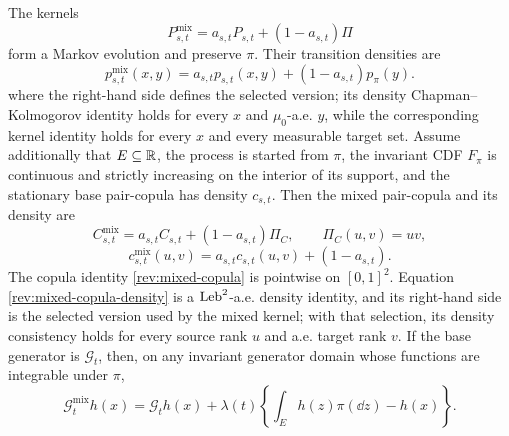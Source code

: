 \begin{theorem}
\label{rev:thm-mixed-kernel}
The kernels
\begin{equation}
P^{\mathrm{mix}}_{s,t}
=a_{s,t}P_{s,t}+(1-a_{s,t})\Pi
\label{rev:mixed-kernel}
\end{equation}
form a Markov evolution and preserve $\pi$.  Their transition densities are
\begin{equation}
p^{\mathrm{mix}}_{s,t}(x,y)
=a_{s,t}p_{s,t}(x,y)+(1-a_{s,t})p_\pi(y).
\label{rev:mixed-transition-density}
\end{equation}
where the right-hand side defines the selected version; its density
Chapman--Kolmogorov identity holds for every $x$ and $\mu_0$-a.e. $y$, while
the corresponding kernel identity holds for every $x$ and every measurable
target set.
Assume additionally that $E\subseteq\mathbb R$, the process is started from $\pi$,
the invariant CDF $F_\pi$ is continuous and strictly increasing on the
interior of its support, and the stationary base pair-copula has density
$c_{s,t}$.  Then the mixed pair-copula and its density are
\begin{equation}
C^{\mathrm{mix}}_{s,t}
=a_{s,t}C_{s,t}+(1-a_{s,t})\Pi_C,
\qquad \Pi_C(u,v)=uv,
\label{rev:mixed-copula}
\end{equation}
\begin{equation}
c^{\mathrm{mix}}_{s,t}(u,v)
=a_{s,t}c_{s,t}(u,v)+(1-a_{s,t}).
\label{rev:mixed-copula-density}
\end{equation}
The copula identity \eqref{rev:mixed-copula} is pointwise on $[0,1]^2$.
Equation \eqref{rev:mixed-copula-density} is a $\operatorname{Leb}^2$-a.e. density identity,
and its right-hand side is the selected version used by the mixed kernel; with
that selection, its density consistency holds for every source rank $u$ and
a.e. target rank $v$.
If the base generator is $\mathcal G_t$, then, on any invariant generator
domain whose functions are integrable under $\pi$,
\begin{equation}
\mathcal G_t^{\mathrm{mix}}h(x)
=\mathcal G_th(x)+\lambda(t)
\left\{\int_Eh(z)\pi(\dd z)-h(x)\right\}.
\label{rev:mixed-generator}
\end{equation}
\end{theorem}

